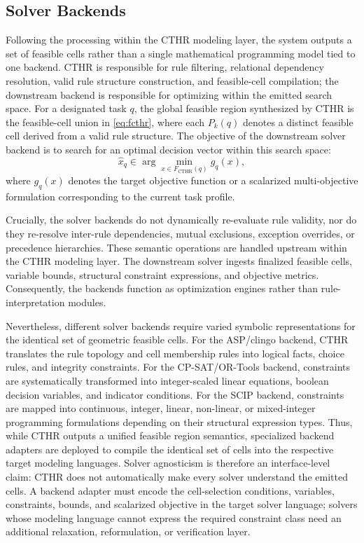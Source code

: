 ﻿\documentclass[a4paper,fleqn]{cas-dc}
\begin{document}
\subsection{Solver Backends}
\label{sec:solver_backends}

Following the processing within the CTHR modeling layer, the system outputs a
set of feasible cells rather than a single mathematical programming
model tied to one backend. CTHR is responsible for rule filtering, relational
dependency resolution, valid rule structure construction, and feasible-cell
compilation; the downstream backend is responsible for optimizing within the
emitted search space. For a designated task $q$, the global feasible region
synthesized by CTHR is the feasible-cell union in \eqref{eq:fcthr}, where each
$P_k(q)$ denotes a distinct feasible cell derived from a valid rule structure.
The objective of the downstream solver backend is to search for an optimal decision vector within this search space:
\begin{equation}
\hat{x}_q \in \arg\min_{x \in F_{\mathrm{CTHR}}(q)} g_q(x),
\end{equation}
where $g_q(x)$ denotes the target objective function or a scalarized multi-objective formulation corresponding to the current task profile.

Crucially, the solver backends do not dynamically re-evaluate rule validity,
nor do they re-resolve inter-rule dependencies, mutual exclusions, exception
overrides, or precedence hierarchies. These semantic operations are handled
upstream within the CTHR modeling layer. The downstream solver ingests finalized
feasible cells, variable bounds, structural constraint expressions, and
objective metrics. Consequently, the backends function as optimization engines
rather than rule-interpretation modules.

Nevertheless, different solver backends require varied symbolic representations for the identical set of geometric feasible cells. For the ASP/clingo backend, CTHR translates the rule topology and cell membership rules into logical facts, choice rules, and integrity constraints. For the CP-SAT/OR-Tools backend, constraints are systematically transformed into integer-scaled linear equations, boolean decision variables, and indicator conditions. For the SCIP backend, constraints are mapped into continuous, integer, linear, non-linear, or mixed-integer programming formulations depending on their structural expression types. Thus, while CTHR outputs a unified feasible region semantics, specialized backend adapters are deployed to compile the identical set of cells into the respective target modeling languages. Solver agnosticism is therefore an interface-level claim: CTHR does not automatically make every solver understand the emitted cells. A backend adapter must encode the cell-selection conditions, variables, constraints, bounds, and scalarized objective in the target solver language; solvers whose modeling language cannot express the required constraint class need an additional relaxation, reformulation, or verification layer.
\end{document}
